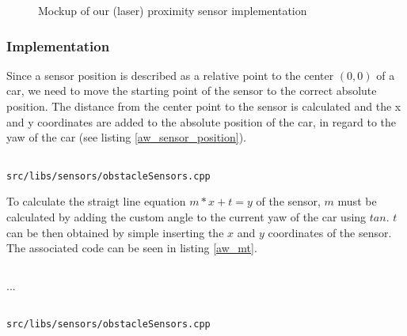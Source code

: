 \documentclass[paper=a4, fontsize=11pt]{scrreprt}
\begin{document}
\begin{figure}[ht]
  \begin{center}
    \caption{Mockup of our (laser) proximity sensor implementation}\label{aw_mockup}
  \end{center}
\end{figure}

\subsubsection{Implementation}
Since a sensor position is described as a relative point to the center $(0,0)$ of a car,
we need to move the starting point of the sensor to the correct absolute position.
The distance from the center point to the sensor is calculated
and the x and y coordinates are added to the absolute position of the car,
in regard to the yaw of the car (see listing \ref{aw_sensor_position}).

\begin{listing}[ht]
  \inputminted[firstline=91,linenos=true,lastline=96,gobble=2]{c++}{../../../simulators/speed-dreams/src/libs/sensors/obstacleSensors.cpp}
  \caption{\texttt{src/libs/sensors/obstacleSensors.cpp}}\label{aw_sensor_position}
\end{listing}

To calculate the straigt line equation $m*x+t=y$ of the sensor,
$m$ must be calculated by adding the custom angle to the current yaw of the car using $tan$.
$t$ can be then obtained by simple inserting the $x$ and $y$ coordinates of the sensor.
The associated code can be seen in listing \ref{aw_mt}.

\begin{listing}[ht]
  \inputminted[firstline=105,linenos=true,lastline=104,gobble=2]{c++}{../../../simulators/speed-dreams/src/libs/sensors/obstacleSensors.cpp}
  \vspace{-0.3cm}...\vspace{-0.3cm}
  \inputminted[firstline=110,linenos=true,lastline=109,gobble=2]{c++}{../../../simulators/speed-dreams/src/libs/sensors/obstacleSensors.cpp}
  \caption{\texttt{src/libs/sensors/obstacleSensors.cpp}}\label{aw_mt}
\end{listing}
\end{document}
